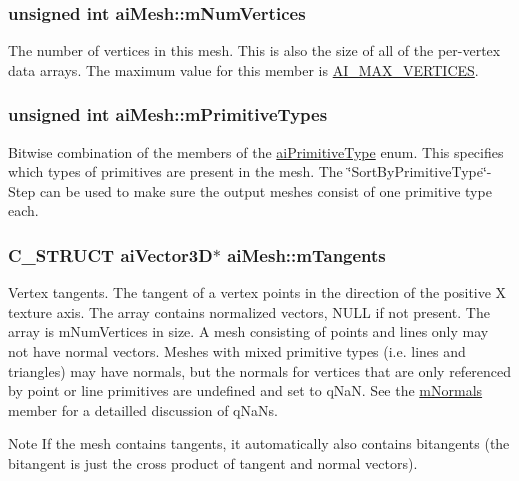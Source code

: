 \hypertarget{structai_mesh_ab34b7b5941e6636f1c08f615cbb072ef}{
\subsubsection[{m\-Num\-Vertices}]{\setlength{\rightskip}{0pt plus 5cm}unsigned int ai\-Mesh\-::m\-Num\-Vertices}}\label{structai_mesh_ab34b7b5941e6636f1c08f615cbb072ef}
The number of vertices in this mesh. This is also the size of all of the per-\/vertex data arrays. The maximum value for this member is \hyperlink{ai_mesh_8h_aa3997d5751b93f15e4c9d86ced093b56}{A\-I\-\_\-\-M\-A\-X\-\_\-\-V\-E\-R\-T\-I\-C\-E\-S}. \hypertarget{structai_mesh_a99d66ac0a444068c1b252b30265cbf53}{
\subsubsection[{m\-Primitive\-Types}]{\setlength{\rightskip}{0pt plus 5cm}unsigned int ai\-Mesh\-::m\-Primitive\-Types}}\label{structai_mesh_a99d66ac0a444068c1b252b30265cbf53}
Bitwise combination of the members of the \hyperlink{ai_mesh_8h_ac352902280db7c3bd8ba64c133b7f03f}{ai\-Primitive\-Type} enum. This specifies which types of primitives are present in the mesh. The \char`\"{}\-Sort\-By\-Primitive\-Type\char`\"{}-\/\-Step can be used to make sure the output meshes consist of one primitive type each. \hypertarget{structai_mesh_af367ff78bd69f3e83d7edc8ad67dc5df}{
\subsubsection[{m\-Tangents}]{\setlength{\rightskip}{0pt plus 5cm}C\-\_\-\-S\-T\-R\-U\-C\-T {\bf ai\-Vector3\-D}$\ast$ ai\-Mesh\-::m\-Tangents}}\label{structai_mesh_af367ff78bd69f3e83d7edc8ad67dc5df}
Vertex tangents. The tangent of a vertex points in the direction of the positive X texture axis. The array contains normalized vectors, N\-U\-L\-L if not present. The array is m\-Num\-Vertices in size. A mesh consisting of points and lines only may not have normal vectors. Meshes with mixed primitive types (i.\-e. lines and triangles) may have normals, but the normals for vertices that are only referenced by point or line primitives are undefined and set to q\-Na\-N. See the \hyperlink{structai_mesh_aec81b496b4d93838cef038933dabe9b9}{m\-Normals} member for a detailled discussion of q\-Na\-Ns. \begin{DoxyNote}{Note}
If the mesh contains tangents, it automatically also contains bitangents (the bitangent is just the cross product of tangent and normal vectors). 
\end{DoxyNote}
